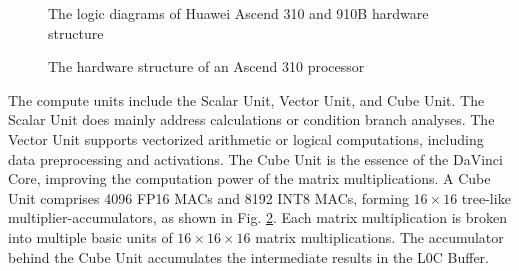 \documentclass[12pt]{extbook}
\begin{document}
\begin{figure}[tb]
    \caption{The logic diagrams of Huawei Ascend 310 and 910B hardware structure}
    \label{fig:dav}
    \end{figure}

\begin{figure}[tb]
    \caption{The hardware structure of an Ascend 310 processor}
    \label{fig:a310}
    \end{figure}

The compute units include the Scalar Unit, Vector Unit, and Cube Unit. The Scalar Unit does mainly address calculations or condition branch analyses. The Vector Unit supports vectorized arithmetic or logical computations, including data preprocessing and activations. The Cube Unit is the essence of the DaVinci Core, improving the computation power of the matrix multiplications. A Cube Unit comprises 4096 FP16 MACs and 8192 INT8 MACs, forming $16 \times 16$ tree-like multiplier-accumulators, as shown in Fig. \ref{fig:a310}. Each matrix multiplication is broken into multiple basic units of $16 \times 16 \times 16$ matrix multiplications. The accumulator behind the Cube Unit accumulates the intermediate results in the L0C Buffer.
\end{document}
